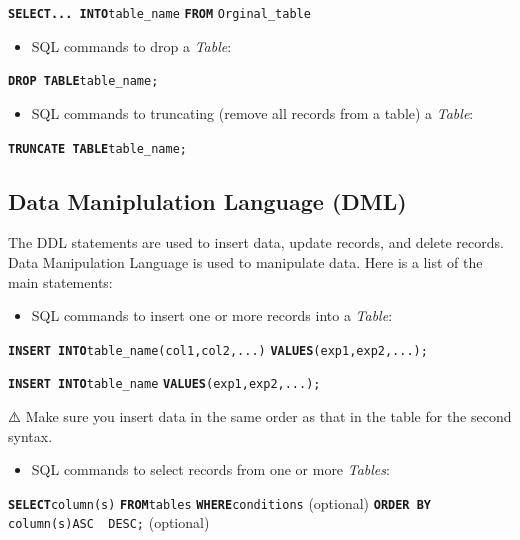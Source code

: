 \documentclass[
  letterpaper,
  DIV=11,
  numbers=noendperiod]{scrreprt}
\providecommand{\tightlist}{%
  \setlength{\itemsep}{0pt}\setlength{\parskip}{0pt}}\usepackage{longtable,booktabs,array}
\begin{document}
\textbf{\texttt{SELECT...\ INTO}}\texttt{table\_name}
\textbf{\texttt{FROM}} \texttt{Orginal\_table}

\begin{itemize}
\tightlist
\item
  SQL commands to drop a \emph{Table}:
\end{itemize}

\textbf{\texttt{DROP\ TABLE}}\texttt{table\_name;}

\begin{itemize}
\tightlist
\item
  SQL commands to truncating (remove all records from a table) a
  \emph{Table}:
\end{itemize}

\textbf{\texttt{TRUNCATE\ TABLE}}\texttt{table\_name;}

\hypertarget{data-maniplulation-language-dml}{%
\subsection*{\texorpdfstring{\textbf{Data Maniplulation Language
(DML)}}{Data Maniplulation Language (DML)}}\label{data-maniplulation-language-dml}}

The DDL statements are used to insert data, update records, and delete
records. Data Manipulation Language is used to manipulate data. Here is
a list of the main statements:

\begin{itemize}
\tightlist
\item
  SQL commands to insert one or more records into a \emph{Table}:
\end{itemize}

\textbf{\texttt{INSERT\ INTO}}\texttt{table\_name(col1,col2,...)}
\textbf{\texttt{VALUES}}\texttt{(exp1,exp2,...);}

\textbf{\texttt{INSERT\ INTO}}\texttt{table\_name}
\textbf{\texttt{VALUES}}\texttt{(exp1,exp2,...);}

⚠️ Make sure you insert data in the same order as that in the table for
the second syntax.

\begin{itemize}
\tightlist
\item
  SQL commands to select records from one or more \emph{Tables}:
\end{itemize}

\textbf{\texttt{SELECT}}\texttt{column(s)}
\textbf{\texttt{FROM}}\texttt{tables}
\textbf{\texttt{WHERE}}\texttt{conditions} (optional)
\textbf{\texttt{ORDER\ BY}} \texttt{column(s)ASC\ \textbar{}\ DESC;}
(optional)
\end{document}
